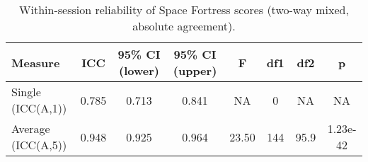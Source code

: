 \begin{table}[ht]
\centering
\caption{Within-session reliability of Space Fortress scores (two-way mixed, absolute agreement).}
\label{tab:icc_sf}
\begin{tabular}{lccccccc}
\toprule
Measure & ICC & 95\% CI (lower) & 95\% CI (upper) & F & df1 & df2 & p \\
\midrule
Single (ICC(A,1)) & 0.785 & 0.713 & 0.841 & NA & 0 & NA & NA \\
Average (ICC(A,5)) & 0.948 & 0.925 & 0.964 & 23.50 & 144 & 95.9 & 1.23e-42 \\
\bottomrule
\end{tabular}
\end{table}
